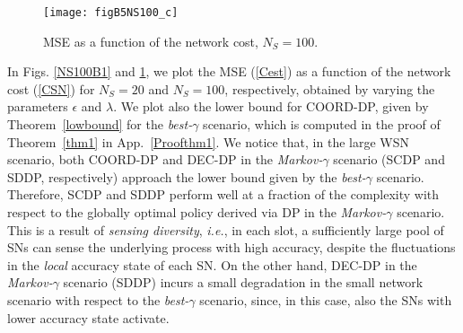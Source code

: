 \documentclass[10pt,twocolumn,twoside]{IEEEtran}
\theoremstyle{plain}
\begin{document}
 \begin{figure}[t]
\centering
\texttt{[image: figB5NS100\_c]}
\vspace{-3mm}
\caption{MSE as a function of the network cost, $N_S=100$.}\label{NS10B1}
\vspace{-5mm}
\end{figure}



In Figs. \ref{NS100B1} and  \ref{NS10B1}, we plot the
 MSE (\ref{Cest}) as a function of the network cost  (\ref{CSN})
 for $N_S{=}20$ and $N_S{=}100$, respectively,  obtained by varying the parameters  $\epsilon$ and $\lambda$.
We plot also the lower bound for COORD-DP, given by Theorem~\ref{lowbound} for the \emph{best-}$\gamma$ scenario,
which is computed in the proof of Theorem~\ref{thm1} in App.~\ref{Proofthm1}.
We notice that, in the large WSN scenario, both COORD-DP and DEC-DP in the \emph{Markov-}$\gamma$ scenario (SCDP and SDDP, respectively) approach
the lower bound given by the \emph{best-}$\gamma$ scenario.
Therefore, SCDP and SDDP
perform well at a fraction of the complexity with respect to the globally optimal policy derived via DP in the \emph{Markov-}$\gamma$ scenario.
This is a result of \emph{sensing diversity}, \emph{i.e.}, in each slot, a sufficiently large pool of SNs
can sense the underlying process with high accuracy, despite the fluctuations in the \emph{local} accuracy state of each SN.
On the other hand,
DEC-DP
in the \emph{Markov-}$\gamma$ scenario (SDDP)
 incurs a small degradation in the small network scenario  with respect to the \emph{best-}$\gamma$ scenario, since, in this case,
also the SNs with lower accuracy state activate.
\end{document}

